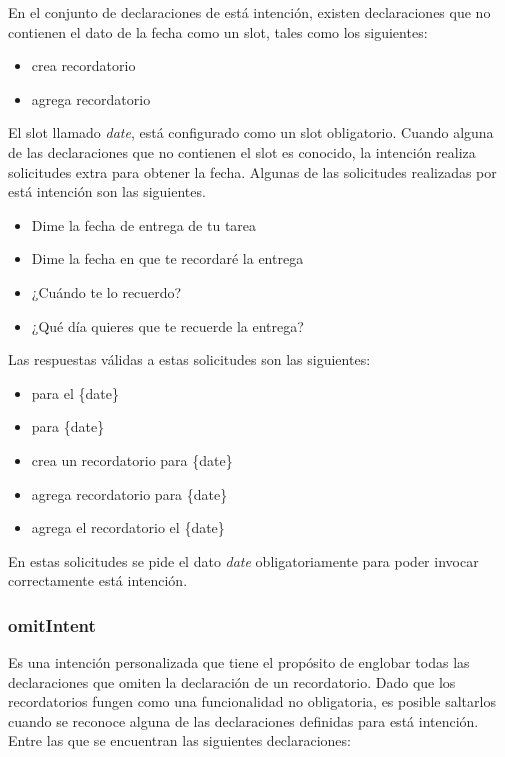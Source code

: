 En el conjunto de declaraciones de está intención, existen declaraciones que no contienen el dato de la fecha como un slot, tales como los siguientes:

\begin{itemize}
  \item crea recordatorio
  \item agrega recordatorio
\end{itemize}

El slot llamado \textit{date}, está configurado como un slot obligatorio. Cuando alguna de las declaraciones que no contienen el slot es conocido, la intención realiza solicitudes extra para obtener la fecha. Algunas de las solicitudes realizadas por está intención son las siguientes.

\begin{itemize}
  \item Dime la fecha de entrega de tu tarea
  \item Dime la fecha en que te recordaré la entrega
  \item ¿Cuándo te lo recuerdo?
  \item ¿Qué día quieres que te recuerde la entrega?
\end{itemize}

Las respuestas válidas a estas solicitudes son las siguientes:

\begin{itemize}
  \item para el \{date\}
  \item para \{date\}
  \item crea un recordatorio para \{date\}
  \item agrega recordatorio para \{date\}
  \item agrega el recordatorio el \{date\}
\end{itemize}

En estas solicitudes se pide el dato \textit{date} obligatoriamente para poder invocar correctamente está intención.


\subsubsection{omitIntent}
\label{omitIntentcapIV}

Es una intención personalizada que tiene el propósito de englobar todas las declaraciones que omiten la declaración de un recordatorio. Dado que los recordatorios fungen como una funcionalidad no obligatoria, es posible saltarlos cuando se reconoce alguna de las declaraciones definidas para está intención. Entre las que se encuentran las siguientes declaraciones:


